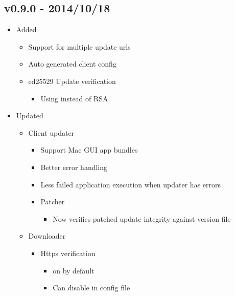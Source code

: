 \documentclass[letterpaper,10pt,english]{sphinxmanual}
\begin{document}
\subsection{v0.9.0 - 2014/10/18}
\label{release_history:v0-9-0-2014-10-18}\begin{itemize}
\item {} 
Added
\begin{itemize}
\item {} 
Support for multiple update urls

\item {} 
Auto generated client config

\item {} 
ed25529 Update verification
\begin{itemize}
\item {} 
Using instead of RSA

\end{itemize}

\end{itemize}

\item {} 
Updated
\begin{itemize}
\item {} 
Client updater
\begin{itemize}
\item {} 
Support Mac GUI app bundles

\item {} 
Better error handling

\item {} 
Less failed application execution when updater
has errors

\item {} 
Patcher
\begin{itemize}
\item {} 
Now verifies patched update integrity
against version file

\end{itemize}

\end{itemize}

\item {} 
Downloader
\begin{itemize}
\item {} 
Https verification
\begin{itemize}
\item {} 
on by default

\item {} 
Can disable in config file


\end{itemize}
\end{itemize}
\end{itemize}
\end{itemize}
\end{document}
